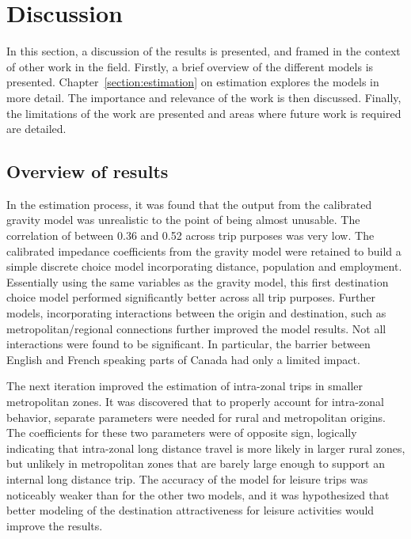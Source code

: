 \chapter{Discussion}
In this section, a discussion of the results is presented, and framed in the context of other work in the field. Firstly, a brief overview of the different models is presented. Chapter~\ref{section:estimation} on estimation explores the models in more detail. The importance and relevance of the work is then discussed. Finally, the limitations of the work are presented and areas where future work is required are detailed.

\section{Overview of results}
In the estimation process, it was found that the output from the calibrated gravity model  was unrealistic to the point of being almost unusable. The correlation of between 0.36 and 0.52 across trip purposes was very low. The calibrated impedance coefficients from the gravity model were retained to build a simple discrete choice model incorporating distance, population and employment. Essentially using the same variables as the gravity model, this first destination choice model performed significantly better across all trip purposes. Further models, incorporating interactions between the origin and destination, such as metropolitan/regional connections further improved the model results. Not all interactions were found to be significant. In particular, the barrier between English and French speaking parts of Canada had only a limited impact. 

The next iteration improved the estimation of intra-zonal trips in smaller metropolitan zones. It was discovered that to properly account for intra-zonal behavior, separate parameters were needed for rural and metropolitan origins. The coefficients for these two parameters were of opposite sign, logically indicating that intra-zonal long distance travel is more likely in larger rural zones, but unlikely in metropolitan zones that are barely large enough to support an internal long distance trip. The accuracy of the model for leisure trips was noticeably weaker than for the other two models, and it was hypothesized that better modeling of the destination attractiveness for leisure activities would improve the results.


